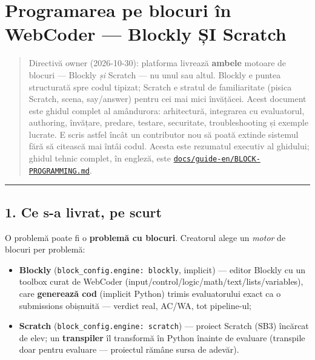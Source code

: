 \documentclass[
]{article}
\author{}
\date{}
\providecommand{\tightlist}{%
  \setlength{\itemsep}{0pt}\setlength{\parskip}{0pt}}
\begin{document}
{
\setcounter{tocdepth}{2}
\tableofcontents
}
\section{Programarea pe blocuri în WebCoder --- Blockly ȘI
Scratch}\label{programarea-pe-blocuri-uxeen-webcoder--blockly-ux219i-scratch}

\begin{quote}
Directivă owner (2026-10-30): platforma livrează \textbf{ambele} motoare
de blocuri --- Blockly \emph{și} Scratch --- nu unul sau altul. Blockly
e puntea structurată spre codul tipizat; Scratch e stratul de
familiaritate (pisica Scratch, scena, say/answer) pentru cei mai mici
învățăcei. Acest document este ghidul complet al amândurora:
arhitectură, integrarea cu evaluatorul, authoring, învățare, predare,
testare, securitate, troubleshooting și exemple lucrate. E scris astfel
încât un contributor nou să poată extinde sistemul fără să citească mai
întâi codul. Acesta este rezumatul executiv al ghidului; ghidul tehnic
complet, în engleză, este
\href{../guide-en/BLOCK-PROGRAMMING.md}{\texttt{docs/guide-en/BLOCK-PROGRAMMING.md}}.
\end{quote}

\begin{center}\rule{0.5\linewidth}{0.5pt}\end{center}

\subsection{1. Ce s-a livrat, pe scurt}\label{1-ce-s-a-livrat-pe-scurt}

O problemă poate fi o \textbf{problemă cu blocuri}. Creatorul alege un
\emph{motor} de blocuri per problemă:

\begin{itemize}
\tightlist
\item
  \textbf{Blockly}
  (\texttt{block\_config.engine:\ \textquotesingle{}blockly\textquotesingle{}},
  implicit) --- editor Blockly cu un toolbox curat de WebCoder
  (input/control/logic/math/text/lists/variables), care
  \textbf{generează cod} (implicit Python) trimis evaluatorului exact ca
  o submissions obișnuită --- verdict real, AC/WA, tot pipeline-ul;
\item
  \textbf{Scratch}
  (\texttt{block\_config.engine:\ \textquotesingle{}scratch\textquotesingle{}})
  --- proiect Scratch (SB3) încărcat de elev; un \textbf{transpiler} îl
  transformă în Python înainte de evaluare (transpile doar pentru
  evaluare --- proiectul rămâne sursa de adevăr).
\end{itemize}
\end{document}
